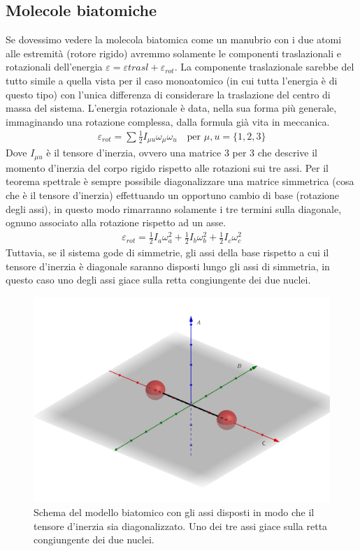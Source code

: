 \documentclass[10pt,a4paper]{article}
\begin{document}
\subsection{Molecole biatomiche}
Se dovessimo vedere la molecola biatomica come un manubrio con i due atomi alle estremità (rotore rigido) avremmo solamente le componenti traslazionali e rotazionali dell'energia \(\varepsilon = \varepsilon{trasl}+\varepsilon_{rot}\). La componente traslazionale sarebbe del tutto simile a quella vista per il caso monoatomico (in cui tutta l'energia è di questo tipo) con l'unica differenza di considerare la traslazione del centro di massa del sistema. L'energia rotazionale è data, nella sua forma più generale, immaginando una rotazione complessa, dalla formula già vita in meccanica.
\begin{align*} 
 \varepsilon_{rot} = \sum\frac{1}{2} I_{\mu u}\omega_{\mu}\omega_u \quad \text{per } \mu, u = \{1,2,3\}
\end{align*} 
Dove \(I_{\mu u}\) è il tensore d'inerzia, ovvero una matrice 3 per 3 che descrive il momento d'inerzia del corpo rigido rispetto alle rotazioni sui tre assi. Per il teorema spettrale è sempre possibile diagonalizzare una matrice simmetrica (cosa che è il tensore d'inerzia)  effettuando un opportuno cambio di base (rotazione degli assi), in questo modo rimarranno solamente i tre termini sulla diagonale, ognuno associato alla rotazione rispetto ad un asse. 
\begin{align*} 
	\varepsilon_{rot} = \frac{1}{2 }I_a \omega_a^2 + \frac{1}{2 } I_b \omega_b^2 + \frac{1}{2 } I_c \omega_c^2
\end{align*}  
Tuttavia, se il sistema gode di simmetrie, gli assi della base rispetto a cui il tensore d'inerzia è diagonale saranno disposti lungo gli assi di simmetria, in questo caso uno degli assi giace sulla retta congiungente dei due nuclei. 
\begin{figure}[h!]
	\centering
	\includegraphics[width=0.6\linewidth]{../images/modello_biatomico1}
	\caption{Schema del modello biatomico con gli assi disposti in modo che il tensore d'inerzia sia diagonalizzato. Uno dei tre assi giace sulla retta congiungente dei due nuclei.}
	\label{fig:modellobiatomico1}
\end{figure}
\end{document}
